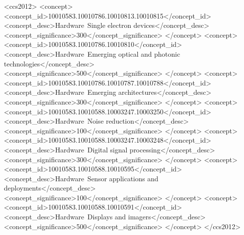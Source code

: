 \documentclass[sigplan,screen]{acmart}
\begin{document}
\begin{CCSXML}
<ccs2012>
   <concept>
       <concept_id>10010583.10010786.10010813.10010815</concept_id>
       <concept_desc>Hardware~Single electron devices</concept_desc>
       <concept_significance>300</concept_significance>
       </concept>
   <concept>
       <concept_id>10010583.10010786.10010810</concept_id>
       <concept_desc>Hardware~Emerging optical and photonic technologies</concept_desc>
       <concept_significance>500</concept_significance>
       </concept>
   <concept>
       <concept_id>10010583.10010786.10010787.10010788</concept_id>
       <concept_desc>Hardware~Emerging architectures</concept_desc>
       <concept_significance>300</concept_significance>
       </concept>
   <concept>
       <concept_id>10010583.10010588.10003247.10003250</concept_id>
       <concept_desc>Hardware~Noise reduction</concept_desc>
       <concept_significance>100</concept_significance>
       </concept>
   <concept>
       <concept_id>10010583.10010588.10003247.10003248</concept_id>
       <concept_desc>Hardware~Digital signal processing</concept_desc>
       <concept_significance>300</concept_significance>
       </concept>
   <concept>
       <concept_id>10010583.10010588.10010595</concept_id>
       <concept_desc>Hardware~Sensor applications and deployments</concept_desc>
       <concept_significance>100</concept_significance>
       </concept>
   <concept>
       <concept_id>10010583.10010588.10010591</concept_id>
       <concept_desc>Hardware~Displays and imagers</concept_desc>
       <concept_significance>500</concept_significance>
       </concept>
 </ccs2012>
\end{CCSXML}


\end{document}
